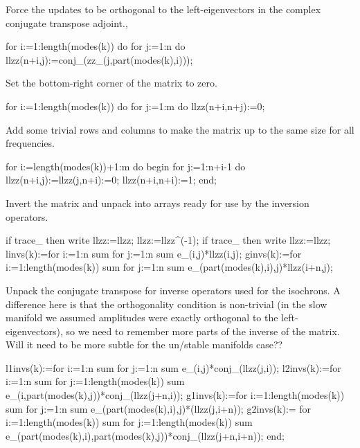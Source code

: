 \documentclass[11pt,a5paper]{article}
\begin{document}
Force the updates to be orthogonal to the left-eigenvectors in the complex conjugate transpose adjoint.,

\begin{reduce}
  for i:=1:length(modes(k)) do 
    for j:=1:n do llzz(n+i,j):=conj_(zz_(j,part(modes(k),i)));
\end{reduce}

Set the bottom-right corner of the matrix to zero.

\begin{reduce}
  for i:=1:length(modes(k)) do 
    for j:=1:m do llzz(n+i,n+j):=0;
\end{reduce}

Add some trivial rows and columns to make the matrix up to the same size for all frequencies.

\begin{reduce}
  for i:=length(modes(k))+1:m do begin 
    for j:=1:n+i-1 do llzz(n+i,j):=llzz(j,n+i):=0;
    llzz(n+i,n+i):=1;
  end;
\end{reduce}

Invert the matrix and unpack into arrays ready for use by the inversion operators.

\begin{reduce}
if trace_ then write llzz:=llzz; 
  llzz:=llzz^(-1);
if trace_ then write llzz:=llzz;
  linvs(k):=for i:=1:n sum for j:=1:n sum e_(i,j)*llzz(i,j);
  ginvs(k):=for i:=1:length(modes(k)) sum 
    for j:=1:n sum e_(part(modes(k),i),j)*llzz(i+n,j);
\end{reduce}

Unpack the conjugate transpose for inverse operators used for the isochrons.  
A difference here is that the orthogonality condition is non-trivial (in the slow manifold we assumed amplitudes were exactly orthogonal to the left-eigenvectors), so we need to remember more parts of the inverse of the matrix.
Will it need to be more subtle for the un/stable manifolds case??

\begin{reduce}
  l1invs(k):=for i:=1:n sum for j:=1:n sum 
      e_(i,j)*conj_(llzz(j,i));
  l2invs(k):=for i:=1:n sum for j:=1:length(modes(k)) sum 
      e_(i,part(modes(k),j))*conj_(llzz(j+n,i));
  g1invs(k):=for i:=1:length(modes(k)) sum for j:=1:n sum 
      e_(part(modes(k),i),j)*(llzz(j,i+n)); %
  g2invs(k):=
    for i:=1:length(modes(k)) sum for j:=1:length(modes(k)) sum 
      e_(part(modes(k),i),part(modes(k),j))*conj_(llzz(j+n,i+n));
end;
\end{reduce}
\end{document}
